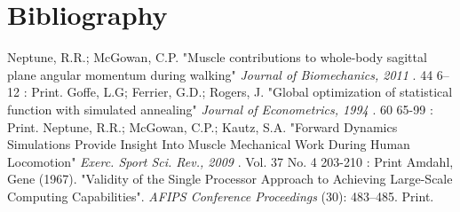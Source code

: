 



\section{Bibliography}

\begin{thebibliography}{99}
 Neptune, R.R.; McGowan, C.P. 
	"Muscle contributions to whole-body sagittal plane angular momentum during walking" 
	{ \em Journal of Biomechanics, 2011 }. 44 6–12 : Print.
 Goffe, L.G; Ferrier, G.D.; Rogers, J. 
	"Global optimization of statistical function with simulated annealing"
	{ \em Journal of Econometrics, 1994 }. 60 65-99 : Print.
 Neptune, R.R.; McGowan, C.P.; Kautz, S.A.
	"Forward Dynamics Simulations Provide Insight Into Muscle Mechanical Work During Human Locomotion"
	{ \em Exerc. Sport Sci. Rev., 2009 }. Vol. 37 No. 4 203-210 : Print
 Amdahl, Gene (1967). "Validity of the Single Processor Approach to Achieving Large-Scale Computing Capabilities". {\em AFIPS Conference Proceedings} (30): 483–485. Print.
\end{thebibliography}
